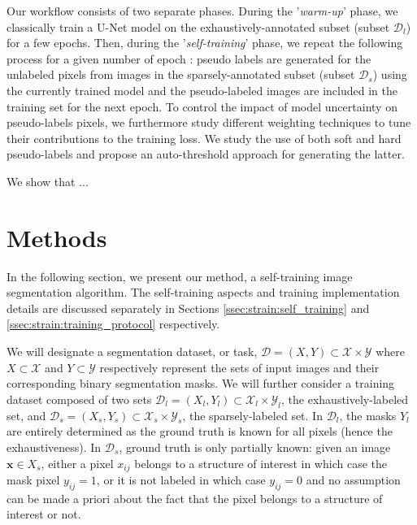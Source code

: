 Our workflow consists of two separate phases. During the '\textit{warm-up}' phase, we classically train a U-Net model on the exhaustively-annotated subset (subset $\mathcal{D}_l$) for a few epochs. Then, during the '\textit{self-training}' phase, we repeat the following process for a given number of epoch : pseudo labels are generated for the unlabeled pixels from images in the sparsely-annotated subset (subset $\mathcal{D}_s$) using the currently trained model and the pseudo-labeled images are included in the training set for the next epoch. To control the impact of model uncertainty on pseudo-labels pixels, we furthermore study different weighting techniques to tune their contributions to the training loss. We study the use of both soft and hard pseudo-labels and propose an auto-threshold approach for generating the latter. 

We show that ... 

\section{Methods}
\label{sec:strain:methods}

In the following section, we present our method, a self-training image segmentation algorithm. The self-training aspects and training implementation details are discussed separately in Sections \ref{ssec:strain:self_training} and \ref{ssec:strain:training_protocol} respectively.

We will designate a segmentation dataset, or task, $\mathcal{D} = \left(X, Y\right) \subset \mathcal{X} \times \mathcal{Y}$ where $X \subset \mathcal{X}$ and $Y \subset \mathcal{Y}$ respectively represent the sets of input images and their corresponding binary segmentation masks. We will further consider a training dataset composed of two sets $\mathcal{D}_l = \left(X_l, Y_l\right) \subset \mathcal{X}_l \times \mathcal{Y}_l$, the exhaustively-labeled set, and $\mathcal{D}_s = \left(X_s, Y_s\right) \subset \mathcal{X}_s \times \mathcal{Y}_s$, the sparsely-labeled set. In $\mathcal{D}_l$, the masks $Y_l$ are entirely determined as the ground truth is known for all pixels (hence the exhaustiveness). In $\mathcal{D}_s$, ground truth is only partially known: given an image $\mathbf{x} \in X_s$, either a pixel $x_{ij}$ belongs to a structure of interest in which case the mask pixel $y_{ij} = 1$, or it is not labeled in which case $y_{ij} = 0$ and no assumption can be made a priori about the fact that the pixel belongs to a structure of interest or not. 

